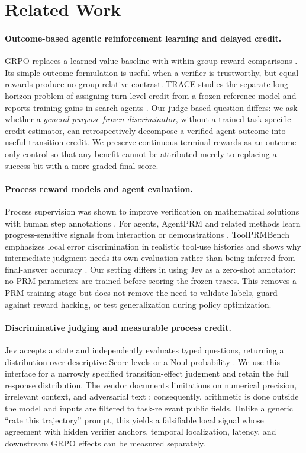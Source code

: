 \documentclass{article}
\begin{document}
\section{Related Work}

\paragraph{Outcome-based agentic reinforcement learning and delayed credit.}
GRPO replaces a learned value baseline with within-group reward comparisons \citep{shao2024deepseekmath}. Its simple outcome formulation is useful when a verifier is trustworthy, but equal rewards produce no group-relative contrast. TRACE studies the separate long-horizon problem of assigning turn-level credit from a frozen reference model and reports training gains in search agents \citep{tao2026trace}. Our judge-based question differs: we ask whether a \emph{general-purpose frozen discriminator}, without a trained task-specific credit estimator, can retrospectively decompose a verified agent outcome into useful transition credit. We preserve continuous terminal rewards as an outcome-only control so that any benefit cannot be attributed merely to replacing a success bit with a more graded final score.

\paragraph{Process reward models and agent evaluation.}
Process supervision was shown to improve verification on mathematical solutions with human step annotations \citep{lightman2023verify}. For agents, AgentPRM and related methods learn progress-sensitive signals from interaction or demonstrations \citep{choudhury2025agentprm,xi2025agentprm}. ToolPRMBench emphasizes local error discrimination in realistic tool-use histories and shows why intermediate judgment needs its own evaluation rather than being inferred from final-answer accuracy \citep{li2026toolprmbench}. Our setting differs in using Jev as a zero-shot annotator: no PRM parameters are trained before scoring the frozen traces. This removes a PRM-training stage but does not remove the need to validate labels, guard against reward hacking, or test generalization during policy optimization.

\paragraph{Discriminative judging and measurable process credit.}
Jev accepts a state and independently evaluates typed questions, returning a distribution over descriptive Score levels or a Noul probability \citep{typesafe2026docs}. We use this interface for a narrowly specified transition-effect judgment and retain the full response distribution. The vendor documents limitations on numerical precision, irrelevant context, and adversarial text \citep{typesafe2026jaggedness}; consequently, arithmetic is done outside the model and inputs are filtered to task-relevant public fields. Unlike a generic ``rate this trajectory'' prompt, this yields a falsifiable local signal whose agreement with hidden verifier anchors, temporal localization, latency, and downstream GRPO effects can be measured separately.
\end{document}
